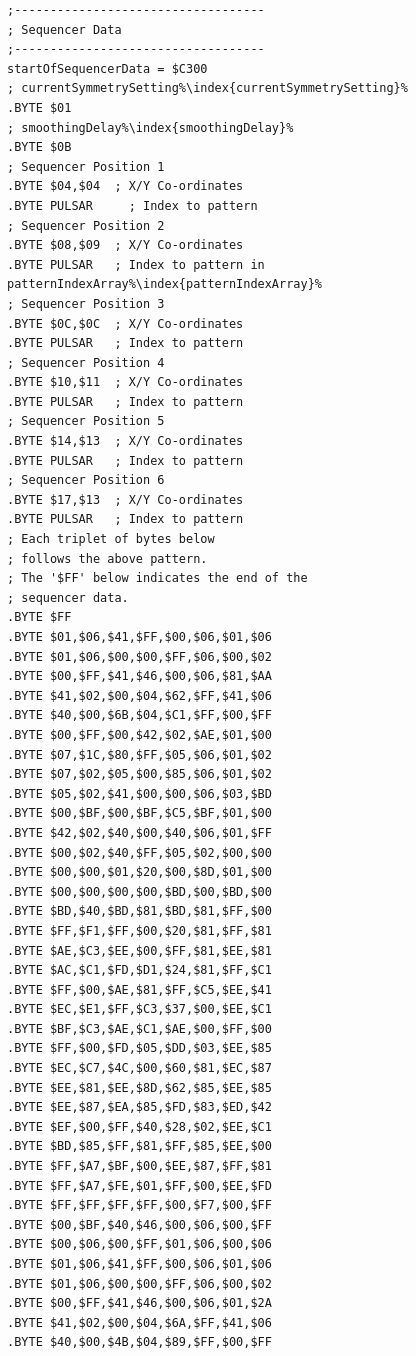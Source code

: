 \clearpage
\begin{minipage}[b]{0.33\linewidth}
\begin{lrbox}{\mybox}%
\begin{lstlisting}[basicstyle=\ttfamily\tiny,escapechar=\%]
;-----------------------------------
; Sequencer Data
;-----------------------------------
startOfSequencerData = $C300
; currentSymmetrySetting%\index{currentSymmetrySetting}%
.BYTE $01
; smoothingDelay%\index{smoothingDelay}%
.BYTE $0B
; Sequencer Position 1
.BYTE $04,$04  ; X/Y Co-ordinates
.BYTE PULSAR     ; Index to pattern    
; Sequencer Position 2
.BYTE $08,$09  ; X/Y Co-ordinates
.BYTE PULSAR   ; Index to pattern in patternIndexArray%\index{patternIndexArray}%   
; Sequencer Position 3
.BYTE $0C,$0C  ; X/Y Co-ordinates
.BYTE PULSAR   ; Index to pattern
; Sequencer Position 4
.BYTE $10,$11  ; X/Y Co-ordinates
.BYTE PULSAR   ; Index to pattern
; Sequencer Position 5
.BYTE $14,$13  ; X/Y Co-ordinates
.BYTE PULSAR   ; Index to pattern
; Sequencer Position 6
.BYTE $17,$13  ; X/Y Co-ordinates
.BYTE PULSAR   ; Index to pattern
; Each triplet of bytes below
; follows the above pattern.
; The '$FF' below indicates the end of the
; sequencer data.
.BYTE $FF
.BYTE $01,$06,$41,$FF,$00,$06,$01,$06
.BYTE $01,$06,$00,$00,$FF,$06,$00,$02
.BYTE $00,$FF,$41,$46,$00,$06,$81,$AA
.BYTE $41,$02,$00,$04,$62,$FF,$41,$06
.BYTE $40,$00,$6B,$04,$C1,$FF,$00,$FF
.BYTE $00,$FF,$00,$42,$02,$AE,$01,$00
.BYTE $07,$1C,$80,$FF,$05,$06,$01,$02
.BYTE $07,$02,$05,$00,$85,$06,$01,$02
.BYTE $05,$02,$41,$00,$00,$06,$03,$BD
.BYTE $00,$BF,$00,$BF,$C5,$BF,$01,$00
.BYTE $42,$02,$40,$00,$40,$06,$01,$FF
.BYTE $00,$02,$40,$FF,$05,$02,$00,$00
.BYTE $00,$00,$01,$20,$00,$8D,$01,$00
.BYTE $00,$00,$00,$00,$BD,$00,$BD,$00
.BYTE $BD,$40,$BD,$81,$BD,$81,$FF,$00
.BYTE $FF,$F1,$FF,$00,$20,$81,$FF,$81
.BYTE $AE,$C3,$EE,$00,$FF,$81,$EE,$81
.BYTE $AC,$C1,$FD,$D1,$24,$81,$FF,$C1
.BYTE $FF,$00,$AE,$81,$FF,$C5,$EE,$41
.BYTE $EC,$E1,$FF,$C3,$37,$00,$EE,$C1
.BYTE $BF,$C3,$AE,$C1,$AE,$00,$FF,$00
.BYTE $FF,$00,$FD,$05,$DD,$03,$EE,$85
.BYTE $EC,$C7,$4C,$00,$60,$81,$EC,$87
.BYTE $EE,$81,$EE,$8D,$62,$85,$EE,$85
.BYTE $EE,$87,$EA,$85,$FD,$83,$ED,$42
.BYTE $EF,$00,$FF,$40,$28,$02,$EE,$C1
.BYTE $BD,$85,$FF,$81,$FF,$85,$EE,$00
.BYTE $FF,$A7,$BF,$00,$EE,$87,$FF,$81
.BYTE $FF,$A7,$FE,$01,$FF,$00,$EE,$FD
.BYTE $FF,$FF,$FF,$FF,$00,$F7,$00,$FF
.BYTE $00,$BF,$40,$46,$00,$06,$00,$FF
.BYTE $00,$06,$00,$FF,$01,$06,$00,$06
.BYTE $01,$06,$41,$FF,$00,$06,$01,$06
.BYTE $01,$06,$00,$00,$FF,$06,$00,$02
.BYTE $00,$FF,$41,$46,$00,$06,$01,$2A
.BYTE $41,$02,$00,$04,$6A,$FF,$41,$06
.BYTE $40,$00,$4B,$04,$89,$FF,$00,$FF

\end{lstlisting}
\end{lrbox}
\end{minipage}
